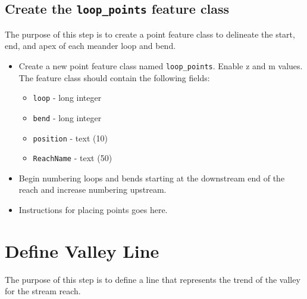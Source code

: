 \documentclass[]{book}
\providecommand{\tightlist}{%
  \setlength{\itemsep}{0pt}\setlength{\parskip}{0pt}}
\theoremstyle{definition}
\theoremstyle{definition}
\theoremstyle{definition}
\theoremstyle{remark}
\begin{document}
\subsection{\texorpdfstring{Create the \texttt{loop\_points} feature
class}{Create the loop\_points feature class}}\label{create-the-loop_points-feature-class}

The purpose of this step is to create a point feature class to delineate
the start, end, and apex of each meander loop and bend.

\begin{itemize}
\tightlist
\item
  Create a new point feature class named \texttt{loop\_points}. Enable z
  and m values. The feature class should contain the following fields:

  \begin{itemize}
  \tightlist
  \item
    \texttt{loop} - long integer
  \item
    \texttt{bend} - long integer
  \item
    \texttt{position} - text (10)
  \item
    \texttt{ReachName} - text (50)
  \end{itemize}
\item
  Begin numbering loops and bends starting at the downstream end of the
  reach and increase numbering upstream.
\item
  Instructions for placing points goes here.
\end{itemize}

\section{Define Valley Line}\label{define-valley-line}

The purpose of this step is to define a line that represents the trend
of the valley for the stream reach.
\end{document}
